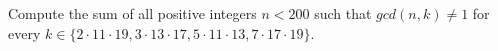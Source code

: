 Compute the sum of all positive integers $n < 200$ such that $gcd(n, k) \ne 1$ for every $k \in\{2 \cdot 11 \cdot 19, 3 \cdot 13 \cdot 17, 5 \cdot 11 \cdot 13, 7 \cdot 17 \cdot 19\}$.